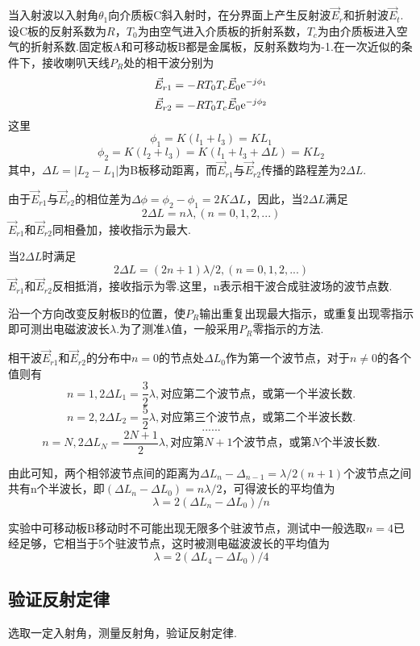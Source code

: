 \documentclass[a4paper]{article}
\begin{document}
当入射波以入射角$\theta_1$向介质板C斜入射时，在分界面上产生反射波$\vec{E}_r$和折射波$\vec{E}_t$.设C板的反射系数为$R$，$T_0$为由空气进入介质板的折射系数，$T_c$为由介质板进入空气的折射系数.固定板A和可移动板B都是金属板，反射系数均为-1.在一次近似的条件下，接收喇叭天线$P_R$处的相干波分别为
$$\vec{E}_{r1}=-RT_0T_c\vec{E}_0{\rm e}^{-j\phi_1}$$
$$\vec{E}_{r2}=-RT_0T_c\vec{E}_0{\rm e}^{-j\phi_2}$$
这里
$$\phi_1=K(l_1+l_3)=KL_1$$
$$\phi_2=K(l_2+l_3)=K(l_1+l_3+\Delta L)=KL_2$$
其中，$\Delta L=|L_2-L_1|$为B板移动距离，而$\vec{E}_{r1}$与$\vec{E}_{r2}$传播的路程差为$2\Delta L$.

由于$\vec{E}_{r1}$与$\vec{E}_{r2}$的相位差为$\Delta \phi=\phi_2-\phi_1=2K\Delta L$，因此，当$2\Delta L$满足
$$2\Delta L = n\lambda, (n=0,1,2,...)$$
$\vec{E}_{r1}$和$\vec{E}_{r2}$同相叠加，接收指示为最大.

当$2\Delta L$时满足
$$2\Delta L=(2n+1)\lambda/2, (n=0,1,2,...)$$
$\vec{E}_{r1}$和$\vec{E}_{r2}$反相抵消，接收指示为零.这里，n表示相干波合成驻波场的波节点数.

沿一个方向改变反射板B的位置，使$P_R$输出重复出现最大指示，或重复出现零指示即可测出电磁波波长$\lambda$.为了测准$\lambda$值，一般采用$P_R$零指示的方法.

相干波$\vec{E}_{r1}$和$\vec{E}_{r2}$的分布中$n=0$的节点处$\Delta L_0$作为第一个波节点，对于$n\neq0$的各个值则有
$$n=1,2\Delta L_1=\frac{3}{2}\lambda,\text{对应第二个波节点，或第一个半波长数.}$$
$$n=2,2\Delta L_2=\frac{5}{2}\lambda,\text{对应第三个波节点，或第二个半波长数.}$$
$$......$$
$$n=N,2\Delta L_N=\frac{2N+1}{2}\lambda,\text{对应第}N+1\text{个波节点，或第}N\text{个半波长数.}$$

由此可知，两个相邻波节点间的距离为$\Delta L_n-\Delta_{n-1}=\lambda/2(n+1)$个波节点之间共有n个半波长，即$(\Delta L_n-\Delta L_0)=n\lambda/2$，可得波长的平均值为
$$\lambda=2(\Delta L_n-\Delta L_0)/n$$

实验中可移动板B移动时不可能出现无限多个驻波节点，测试中一般选取$n=4$已经足够，它相当于5个驻波节点，这时被测电磁波波长的平均值为
$$\lambda=2(\Delta L_4-\Delta L_0)/4$$
\subsection{验证反射定律}
选取一定入射角，测量反射角，验证反射定律.
\end{document}
